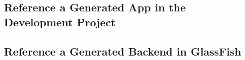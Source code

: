 
\subsection{Reference a Generated App in the Development Project} \label{subsec:link-apps}

\subsection{Reference a Generated Backend in GlassFish}
